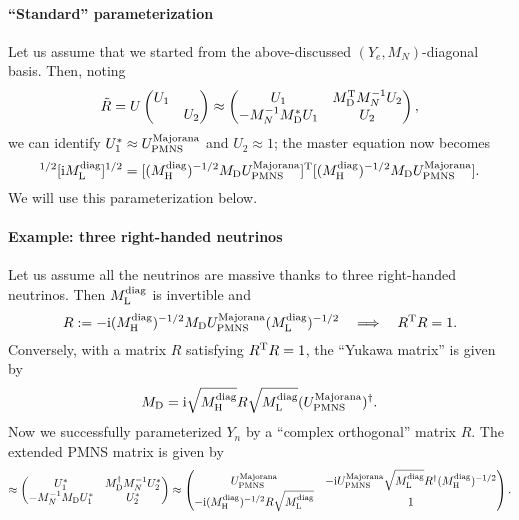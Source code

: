 \documentclass[CheatSheet]{subfiles}
\newcommand\MD[1][]{M_{\mathrm{D}#1}}
\newcommand\MN[1][]{M_{N#1}}
\begin{document}
\paragraph{``Standard'' parameterization}
Let us assume that we started from the above-discussed $(Y_e,\MN)$-diagonal basis.
Then, noting
\begin{equation}
 \tilde R=U\pmat{U_1\\&U_2}\approx \pmat{U_1 & \MD^\TT\MN^{-1}U_2 \\ -\MN^{-1}\MD^* U_1 & U_2},
\end{equation}
we can identify $U_1^*\approx U^{\text{Majorana}}_{\mathrm{PMNS}}$ and $U_2\approx 1$; the master equation now becomes
\begin{equation}
 [\ii M\w L\wdiag]^{1/2}[\ii M\w L\wdiag]^{1/2} =
[(M\w H\wdiag)^{-1/2}\MD U^{\text{Majorana}}\w{PMNS}]^\TT
[(M\w H\wdiag)^{-1/2}\MD U^{\text{Majorana}}\w{PMNS}].
\end{equation}
We will use this parameterization below.

\paragraph{Example: three right-handed neutrinos}
Let us assume all the neutrinos are massive thanks to three right-handed neutrinos. Then $M_{\mathrm{L}}^{\text{diag}}$ is invertible and
\begin{equation}
 R:=-\ii (M\w H\wdiag)^{-1/2}\MD  U^{\text{Majorana}}\w{PMNS}  (M\w L^\text{diag})^{-1/2}
\quad\Longrightarrow\quad R^\TT R=1.
\end{equation}
Conversely, with a matrix $R$ satisfying $R^{\mathrm{T}} R=1$, the ``Yukawa matrix'' is given by
\begin{equation}
 \MD = \ii \sqrt{M\w H^\text{diag}}R\sqrt{M\w L^\text{diag}}(U^{\text{Majorana}}\w{PMNS} )^\dagger.
\end{equation}
Now we successfully parameterized $Y_n$ by a ``complex orthogonal'' matrix $R$.
The extended PMNS matrix is given by
\begin{equation}
 \approx \pmat{
  U_1^* & \MD^\dagger \MN^{-1}U_2^*\\
  -\MN^{-1}\MD U_1^* & U_2^*
}
\approx
\pmat{
 U^{\text{Majorana}}\w{PMNS} & -\ii U^{\text{Majorana}}\w{PMNS} 
\sqrt{M\w L^\text{diag}}R^\dagger
(M\w H^\text{diag})^{-1/2}\\
  -\ii(M\w H^\text{diag})^{-1/2}R\sqrt{M\w L^\text{diag}}
&1
}.
\end{equation}
\end{document}
